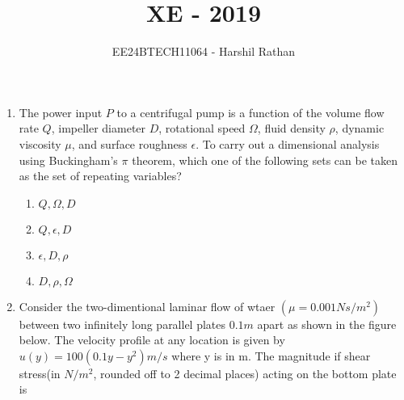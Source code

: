 \documentclass[journal]{IEEEtran}
\begin{document}

\vspace{3cm}

\title{XE - 2019}
\author{EE24BTECH11064 - Harshil Rathan}
\maketitle

\renewcommand{\thefigure}{\theenumi}
\renewcommand{\thetable}{\theenumi}

\begin{enumerate}
\item The power input $P$ to a centrifugal pump is a function of the volume flow rate $Q$, impeller
diameter $D$, rotational speed $\Omega$, fluid density $\rho$, dynamic viscosity $\mu$, and surface
roughness $\epsilon$. To carry out a dimensional analysis using Buckingham's $\pi$ theorem, which one 
of the following sets can be taken as the set of repeating variables?
\begin{multicols}{2}
    \begin{enumerate}
        \item $Q,\Omega,D$
        \item $Q,\epsilon,D$
        \item $\epsilon,D,\rho$
        \item $D,\rho,\Omega$
    \end{enumerate}
\end{multicols}
\item Consider the two-dimentional laminar flow of wtaer $(\mu=0.001 Ns/m^2)$between two infinitely long parallel plates $0.1m$ apart as shown in the figure below. The velocity profile at any location is given by $u(y)=100(0.1y-y^2)m/s$ where y is in m. The magnitude if shear stress(in $N/m^2$, rounded off to 2 decimal places) acting on the bottom plate is \underline{\hspace{1cm}} 
\begin{figure}[H]
\centering
{}
\end{figure}
\end{enumerate}
\end{document}

